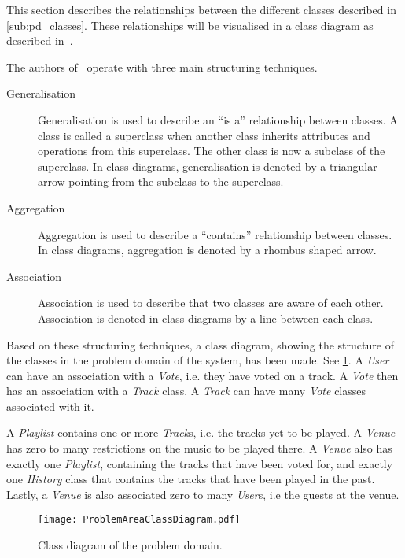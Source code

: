 This section describes the relationships between the different classes
described in \cref{sub:pd_classes}. These relationships will be
visualised in a class diagram as described
in~\cite{mathiassen2001objektorienteret}.

The authors of~\cite{mathiassen2001objektorienteret} operate with three
main structuring techniques.

\begin{description}
\item[Generalisation] Generalisation is used to describe an \enquote{is a}
  relationship between classes. A class is called a
  superclass when another class inherits attributes and operations
  from this superclass. The other class is now a subclass of the
  superclass. In class diagrams, generalisation is denoted by a
  triangular arrow pointing from the subclass to the superclass.
\item[Aggregation] Aggregation is used to describe a
  \enquote{contains} relationship between classes. In class diagrams,
  aggregation is denoted by a rhombus shaped arrow.
\item[Association] Association is used to describe that two classes
  are aware of each other. Association is denoted in class diagrams by
  a line between each class.
\end{description}

Based on these structuring techniques, a class diagram, showing the
structure of the classes in the problem domain of the system, has been
made. See \cref{fig:pd_structure}. A \textit{User} can have an
association with a \textit{Vote}, i.e. they have voted on a track. A
\textit{Vote} then has an association with a \textit{Track} class. A
\textit{Track} can have many \textit{Vote} classes associated with
it.

A \textit{Playlist} contains one or more \textit{Track}s, i.e. the
tracks yet to be played. A \textit{Venue} has zero to many
restrictions on the music to be played there. A \textit{Venue} also
has exactly one \textit{Playlist}, containing the tracks that have
been voted for, and exactly one \textit{History} class that contains
the tracks that have been played in the past. Lastly, a \textit{Venue} is also associated zero to
many \textit{User}s, i.e the guests at the venue.

\begin{figure}[htbp]
  \centering
  \texttt{[image: ProblemAreaClassDiagram.pdf]}
  \caption{Class diagram of the problem domain.}\label{fig:pd_structure}
\end{figure}
